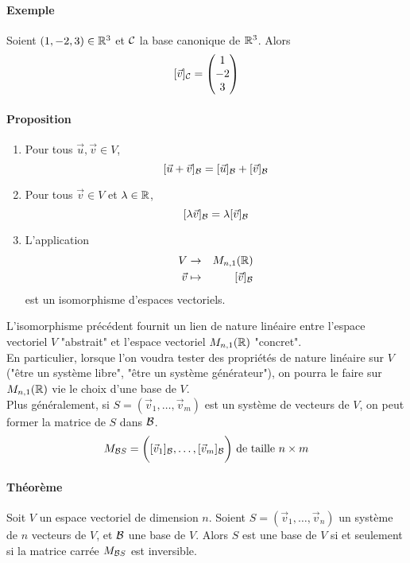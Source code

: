 \paragraph{Exemple} Soient $(1, -2, 3) \in \mathbb{R}^3$ et $\mathcal{C}$ la base canonique de $\mathbb{R}^3$. Alors
$$[\vec{v}]_{\mathcal{C}} = 
\begin{pmatrix} 
  1 \\ 
  -2 \\ 
  3 
\end{pmatrix}$$

\paragraph{Proposition} 
\begin{enumerate}
  \item Pour tous $\vec{u}, \vec{v} \in V$, 
    $$[\vec{u} + \vec{v}]_{\mathcal{B}} = [\vec{u}]_{\mathcal{B}} + [\vec{v}]_{\mathcal{B}}$$
  \item Pour tous $\vec{v} \in V$ et $\lambda  \in \mathbb{R}$, 
    $$[\lambda \vec{v}]_{\mathcal{B}} = \lambda [\vec{v}]_{\mathcal{B}}$$
  \item L'application
    \begin{eqnarray*}
      V &\rightarrow& M_{n, 1}(\mathbb{R}) \\
      \vec{v} &\mapsto& [\vec{v}]_{\mathcal{B}}
    \end{eqnarray*}
    est un isomorphisme d'espaces vectoriels.
\end{enumerate}
L'isomorphisme précédent fournit un lien de nature linéaire entre l'espace vectoriel $V$ "abstrait" et l'espace vectoriel $M_{n, 1}(\mathbb{R})$ "concret". \\
En particulier, lorsque l'on voudra tester des propriétés de nature linéaire sur $V$ ("être un système libre", "être un système générateur"), on pourra le faire sur $M_{n, 1}(\mathbb{R})$ vie le choix d'une base de $V$. \\
Plus généralement, si $S=(\vec{v}_1, \ldots, \vec{v}_m)$ est un système de vecteurs de $V$, on peut former la matrice de $S$ dans $\mathcal{B}$.
$$M_{\mathcal{B} S} = \bigg( [\vec{v}_1]_{\mathcal{B}}, \ldots, [\vec{v}_m]_{\mathcal{B}} \bigg) \text{ de taille } n \times m$$

\paragraph{Théorème} Soit $V$ un espace vectoriel de dimension $n$. Soient $S = (\vec{v}_1, \ldots, \vec{v}_n)$ un système de $n$ vecteurs de $V$, et $\mathcal{B}$ une base de $V$. Alors $S$ est une base de $V$ si et seulement si la matrice carrée $M_{\mathcal{B} S}$ est inversible.


